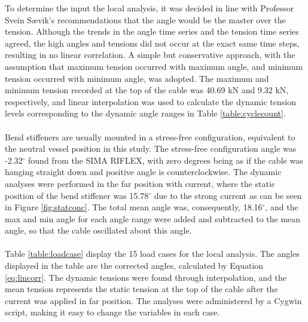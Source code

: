 To determine the input the local analysis, it was decided in line with Professor Svein Sævik's recommendations that the angle would be the master over the tension. Although the trends in the angle time series and the tension time series agreed, the high angles and tensions did not occur at the exact same time steps, resulting in no linear correlation. A simple but conservative approach, with the assumption that maximum tension occurred with maximum angle, and minimum tension occurred with minimum angle, was adopted. The maximum and minimum tension recorded at the top of the cable was 40.69 kN and 9.32 kN, respectively, and linear interpolation was used to calculate the dynamic tension levels corresponding to the dynamic angle ranges in Table \ref{table:cyclecount}. \\\\Bend stiffeners are usually mounted in a stress-free configuration, equivalent to the neutral vessel position in this study. The stress-free configuration angle was -2.32$^\circ$ found from the SIMA RIFLEX, with zero degrees being as if the cable was hanging straight down and positive angle is counterclockwise. The dynamic analyses were performed in the far position with current, where the static position of the bend stiffener was 15.78$^\circ$ due to the strong current as can be seen in Figure \ref{fig:statconc}. The total mean angle was, consequently, 18.16$^\circ$, and the max and min angle for each angle range were added and subtracted to the mean angle, so that the cable oscillated about this angle.\\\\
Table  \ref{table:loadcase} display the 15 load cases for the local analysis. The angles displayed in the table are the corrected angles, calculated by Equation \ref{eq:lincorr}. The dynamic tensions were found through interpolation, and the mean tension represents the static tension at the top of the cable after the current was applied in far position. The analyses were administered by a Cygwin script, making it easy to change the variables in each case. 
